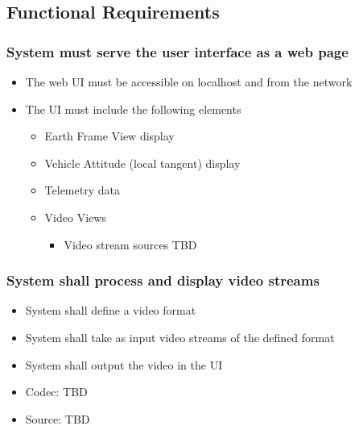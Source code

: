 \subsection{Functional Requirements}

\subsubsection{System must serve the user interface as a web page}
  \begin{itemize}
    \item The web UI must be accessible on localhost and from the network
    \item The UI must include the following elements
    \begin{itemize}
      \item Earth Frame View display
      \item Vehicle Attitude (local tangent) display
      \item Telemetry data
      \item Video Views
      \begin{itemize}
        \item Video stream sources TBD
      \end{itemize}
    \end{itemize}
  \end{itemize}

\subsubsection{System shall process and display video streams}
  \begin{itemize}
    \item System shall define a video format
    \item System shall take as input video streams of the defined format
    \item System shall output the video in the UI
    \item Codec: TBD
    \item Source: TBD
  \end{itemize}

